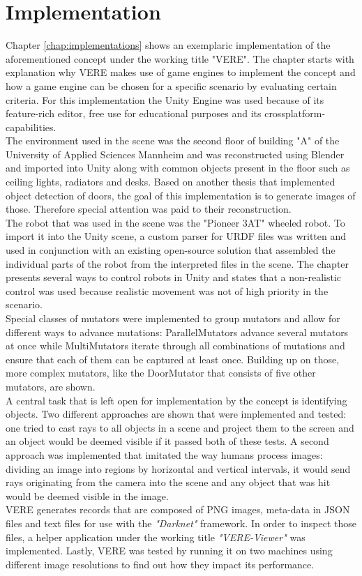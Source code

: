 \section{Implementation}
Chapter \ref{chap:implementations} shows an exemplaric implementation of the aforementioned concept under the working title "\ac{VERE}". The chapter starts with explanation why VERE makes use of game engines to implement the concept and how a game engine can be chosen for a specific scenario by evaluating certain criteria. For this implementation the Unity Engine was used because of its feature-rich editor, free use for educational purposes and its crossplatform-capabilities.\\
The environment used in the scene was the second floor of building "A" of the University of Applied Sciences Mannheim and was reconstructed using Blender and imported into Unity along with common objects present in the floor such as ceiling lights, radiators and desks. Based on another thesis that implemented object detection of doors, the goal of this implementation is to generate images of those. Therefore special attention was paid to their reconstruction.\\
The robot that was used in the scene was the "Pioneer 3AT" wheeled robot. To import it into the Unity scene, a custom parser for \ac{URDF} files was written and used in conjunction with an existing open-source solution that assembled the individual parts of the robot from the interpreted files in the scene. The chapter presents several ways to control robots in Unity and states that a non-realistic control was used because realistic movement was not of high priority in the scenario.\\
Special classes of mutators were implemented to group mutators and allow for different ways to advance mutations: ParallelMutators advance several mutators at once while MultiMutators iterate through all combinations of mutations and ensure that each of them can be captured at least once. Building up on those, more complex mutators, like the DoorMutator that consists of five other mutators, are shown.\\
A central task that is left open for implementation by the concept is identifying objects. Two different approaches are shown that were implemented and tested: one tried to cast rays to all objects in a scene and project them to the screen and an object would be deemed visible if it passed both of these tests. A second approach was implemented that imitated the way humans process images: dividing an image into regions by horizontal and vertical intervals, it would send rays originating from the camera into the scene and any object that was hit would be deemed visible in the image.\\
VERE generates records that are composed of PNG images, meta-data in JSON files and text files for use with the \textit{"Darknet"} framework. In order to inspect those files, a helper application under the working title \emph{"VERE-Viewer"} was implemented. Lastly, \ac{VERE} was tested by running it on two machines using different image resolutions to find out how they impact its performance.